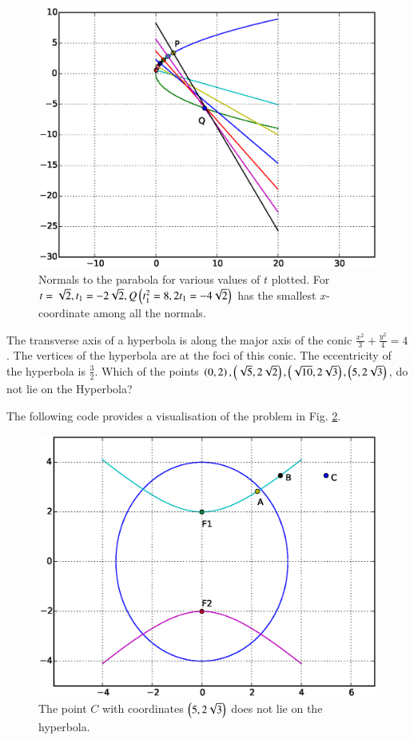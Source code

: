 \documentclass[journal,12pt,twocolumn]{IEEEtran}
\begin{document}
%
\begin{figure}[h]
\centering
\includegraphics[width=\columnwidth]{./figs/ee16b1023}
\caption{ Normals to the parabola for various values of $t$ plotted.  For $t = \sqrt{2}, t_1 = -2\sqrt{2}, Q\left(t_1^2 = 8, 2t_1 = -4\sqrt{2}\right)$ has the smallest $x$-coordinate   among all the normals.}
\label{fig_23}	
\end{figure}
%
\begin{problem}
The transverse axis of a hyperbola is along the major axis of the conic $\frac{x^2}{3}+ \frac{y^2}{4} = 4$. The vertices of the hyperbola are at the foci of this conic. The eccentricity of the hyperbola is $\frac{3}{2}$. Which of the points $\left(0,2\right),\left(\sqrt{5},2\sqrt{2}\right),\left(\sqrt{10},2\sqrt{3}\right),\left(5, 2\sqrt{3}\right)$, do not lie on the Hyperbola?
\end{problem}
\solution

The following code provides a visualisation of the problem in Fig. \ref{fig_24}.

%
\begin{figure}[h]
\centering
\includegraphics[width=\columnwidth]{./figs/ee16b1024}
\caption{ The point $C$ with coordinates $\left(5, 2\sqrt{3}\right)$ does not lie on the hyperbola.}
\label{fig_24}	
\end{figure}
%
\end{document}
